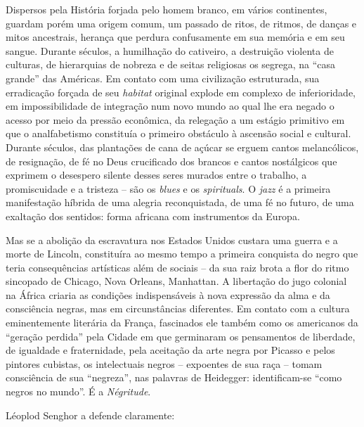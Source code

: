 \documentclass[
  letterpaper,
  DIV=11,
  numbers=noendperiod]{scrreprt}
\begin{document}
Dispersos pela História forjada pelo homem branco, em vários
continentes, guardam porém uma origem comum, um passado de ritos, de
ritmos, de danças e mitos ancestrais, herança que perdura confusamente
em sua memória e em seu sangue. Durante séculos, a humilhação do
cativeiro, a destruição violenta de culturas, de hierarquias de nobreza
e de seitas religiosas os segrega, na ``casa grande'' das Américas. Em
contato com uma civilização estruturada, sua erradicação forçada de seu
\emph{habitat} original explode em complexo de inferioridade, em
impossibilidade de integração num novo mundo ao qual lhe era negado o
acesso por meio da pressão econômica, da relegação a um estágio
primitivo em que o analfabetismo constituía o primeiro obstáculo à
ascensão social e cultural. Durante séculos, das plantações de cana de
açúcar se erguem cantos melancólicos, de resignação, de fé no Deus
crucificado dos brancos e cantos nostálgicos que exprimem o desespero
silente desses seres murados entre o trabalho, a promiscuidade e a
tristeza -- são os \emph{blues} e os \emph{spirituals}. O \emph{jazz} é
a primeira manifestação híbrida de uma alegria reconquistada, de uma fé
no futuro, de uma exaltação dos sentidos: forma africana com
instrumentos da Europa.

Mas se a abolição da escravatura nos Estados Unidos custara uma guerra e
a morte de Lincoln, constituíra ao mesmo tempo a primeira conquista do
negro que teria consequências artísticas além de sociais -- da sua raiz
brota a flor do ritmo sincopado de Chicago, Nova Orleans, Manhattan. A
libertação do jugo colonial na África criaria as condições
indispensáveis à nova expressão da alma e da consciência negras, mas em
circunstâncias diferentes. Em contato com a cultura eminentemente
literária da França, fascinados ele também como os americanos da
``geração perdida'' pela Cidade em que germinaram os pensamentos de
liberdade, de igualdade e fraternidade, pela aceitação da arte negra por
Picasso e pelos pintores cubistas, os intelectuais negros -- expoentes
de sua raça -- tomam consciência de sua ``negreza'', nas palavras de
Heidegger: identificam-se ``como negros no mundo''. É a
\emph{Négritude}.

Léoplod Senghor a defende claramente:
\end{document}
